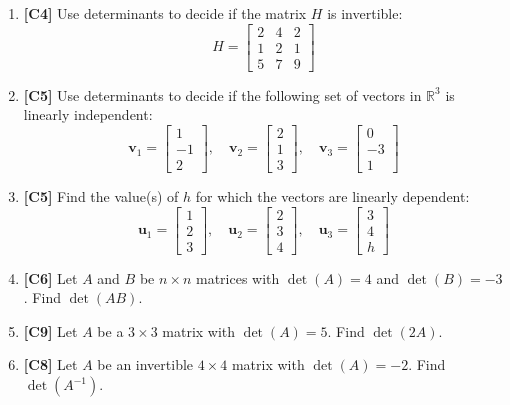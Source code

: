 \documentclass[11pt]{article}
\begin{document}
\begin{enumerate}
    \item \textbf{[C4]} Use determinants to decide if the matrix $H$ is invertible:
    \[ H = \begin{bmatrix} 2 & 4 & 2 \\ 1 & 2 & 1 \\ 5 & 7 & 9 \end{bmatrix} \]

    \item \textbf{[C5]} Use determinants to decide if the following set of vectors in $\mathbb{R}^3$ is linearly independent:
    \[ \mathbf{v}_1 = \begin{bmatrix} 1 \\ -1 \\ 2 \end{bmatrix}, \quad \mathbf{v}_2 = \begin{bmatrix} 2 \\ 1 \\ 3 \end{bmatrix}, \quad \mathbf{v}_3 = \begin{bmatrix} 0 \\ -3 \\ 1 \end{bmatrix} \]

    \item \textbf{[C5]} Find the value(s) of $h$ for which the vectors are linearly dependent:
    \[ \mathbf{u}_1 = \begin{bmatrix} 1 \\ 2 \\ 3 \end{bmatrix}, \quad \mathbf{u}_2 = \begin{bmatrix} 2 \\ 3 \\ 4 \end{bmatrix}, \quad \mathbf{u}_3 = \begin{bmatrix} 3 \\ 4 \\ h \end{bmatrix} \]

    \item \textbf{[C6]} Let $A$ and $B$ be $n \times n$ matrices with $\det(A) = 4$ and $\det(B) = -3$. Find $\det(AB)$.

    \item \textbf{[C9]} Let $A$ be a $3 \times 3$ matrix with $\det(A) = 5$. Find $\det(2A)$.

    \item \textbf{[C8]} Let $A$ be an invertible $4 \times 4$ matrix with $\det(A) = -2$. Find $\det(A^{-1})$.


\end{enumerate}
\end{document}
